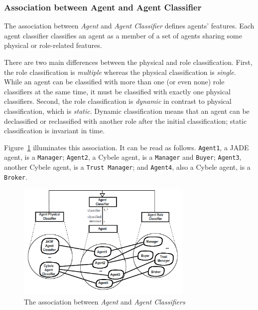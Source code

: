 \subsubsection*{Association between Agent and Agent Classifier}

The association between \textit{Agent} and \textit{Agent Classifier} defines agents' features.
Each agent classifier classifies an agent as a member of a set of agents sharing some physical or role-related features.

There are two main differences between the physical and role classification. First, the role classification is \textit{multiple} whereas the physical classification is \textit{single}.
While an agent can be classified with more than one (or even none) role classifiers at the same time, it must be classified with exactly one physical classifiers.
Second, the role classification is \textit{dynamic} in contrast to physical classification, which is \textit{static}.
Dynamic classification means that an agent can be declassified or reclassified with another role after the initial classification; static classification is invariant in time.

Figure~\ref{figure:onp-agent-agent-classifier-association} illuminates this association.
It can be read as follows. \texttt{Agent1}, a JADE agent, is a \texttt{Manager}; \texttt{Agent2}, a Cybele agent, is a \texttt{Manager} and \texttt{Buyer}; \texttt{Agent3}, another Cybele agent, is a \texttt{Trust Manager}; and \texttt{Agent4}, also a Cybele agent, is a \texttt{Broker}.

\begin{figure}[ht]
	\centering
	\includegraphics[width=0.75\textwidth]{images/onp/agent-agent-classifier-association.png}
	\caption{The association between \textit{Agent} and \textit{Agent Classifiers}}
	\label{figure:onp-agent-agent-classifier-association}
\end{figure}

